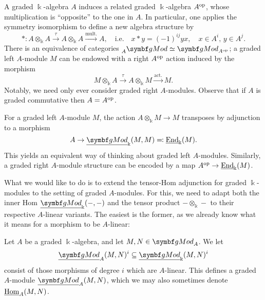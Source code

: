 \begin{remark}
	A graded \(\Bbbk\)-algebra \(A\) induces a related graded \(\Bbbk\)-algebra \(A^{\mathrm{op}}\), whose multiplication is ``opposite'' to the one in \(A\). In particular, one
	applies the symmetry isomorphism to define a new algebra structure by
	\[ *\!:A\otimes_\Bbbk A \overset\tau\to A\otimes_\Bbbk A \overset{\text{mult.}}\to A,\quad \text{i.e.}\quad x*y = (-1)^{ij}yx,\quad x\in A^i,\, y\in A^j. \]
	There is an equivalence of categories \(\prescript{}{A}{\gMod} \simeq \gMod_{A^\op}\); a graded left \(A\)-module \(M\)
	can be endowed with a right \(A^{\mathrm{op}}\) action induced by the morphism
	\[ M \otimes_\Bbbk A \overset\tau\to A\otimes_\Bbbk M \overset{\text{act.}}\to M. \]
	Notably, we need only ever consider graded right \(A\)-modules. Observe that if \(A\) is graded commutative then \(A=A^{\mathrm{op}}\).
\end{remark}
\begin{remark}
	For a graded left \(A\)-module \(M\), the action \(A\otimes_\Bbbk M \to M\) transposes by adjunction to a morphism
	\[ A \to \ugMod_\Bbbk(M,M) \eqcolon \underline{\End}_\Bbbk(M). \]
	This yields an equivalent way of thinking about graded left \(A\)-modules. Similarly, a graded right \(A\)-module structure can be encoded
	by a map \(A^{\mathrm{op}} \to \underline{\operatorname{End}}_\Bbbk(M)\).
\end{remark}

What we would like to do is to extend the tensor-Hom adjunction for graded \(\Bbbk\)-modules to the setting of graded \(A\)-modules. For this,
we need to adapt both the inner Hom \(\ugMod_\Bbbk(-,-)\) and the tensor product \(-\otimes_\Bbbk-\) to their respective \(A\)-linear variants.
The easiest is the former, as we already know what it means for a morphism to be \(A\)-linear:

\begin{definition}
	Let \(A\) be a graded \(\Bbbk\)-algebra, and let \(M,N\in\gMod_A\). We let
	\[ \ugMod_A(M,N)^i \subseteq \ugMod_\Bbbk(M,N)^i \]
	consist of those morphisms of degree \(i\) which are \(A\)-linear. This defines a graded \(A\)-module \(\ugMod_A(M,N)\), which we may also
	sometimes denote \(\underline{\operatorname{Hom}}_A(M,N)\).
\end{definition}

